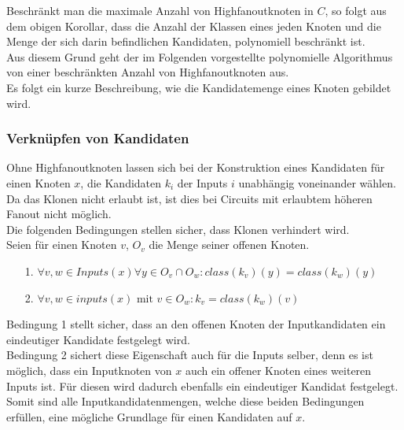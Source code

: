 \documentclass[11pt, a4paper, german]{article}
\begin{document}
Beschränkt man die maximale Anzahl von Highfanoutknoten in $C$, so folgt aus dem obigen Korollar, dass die Anzahl der Klassen eines jeden Knoten und die Menge der sich darin befindlichen Kandidaten, polynomiell beschränkt ist. \\
Aus diesem Grund geht der im Folgenden vorgestellte polynomielle Algorithmus von einer beschränkten Anzahl von Highfanoutknoten aus.\\ 

Es folgt ein kurze Beschreibung, wie die Kandidatemenge eines Knoten gebildet wird.

\subsubsection{Verknüpfen von Kandidaten}
Ohne Highfanoutknoten lassen sich bei der Konstruktion eines Kandidaten für einen Knoten $x$, die Kandidaten $k_i$ der Inputs $i$ unabhängig voneinander wählen.
Da das Klonen nicht erlaubt ist, ist dies bei Circuits mit erlaubtem höheren Fanout nicht möglich.\\
Die folgenden Bedingungen stellen sicher, dass Klonen verhindert wird. \\
Seien für einen Knoten $v$, $O_v$ die Menge seiner offenen Knoten.
\begin{itemize}
	\item[1.] $\forall v,w \in Inputs(x) \forall y \in O_v \cap O_w : class(k_v)(y) = class(k_w)(y)$
	\item[2.] $\forall v,w \in inputs(x) \text{ mit } v \in O_w : k_v = class(k_w)(v)$
\end{itemize}
Bedingung 1 stellt sicher, dass an den offenen Knoten der Inputkandidaten ein eindeutiger Kandidate festgelegt wird.\\ Bedingung 2 sichert diese Eigenschaft auch für die Inputs selber, denn es ist möglich, dass ein Inputknoten von $x$ auch ein offener Knoten eines weiteren Inputs ist. Für diesen wird dadurch ebenfalls ein eindeutiger Kandidat festgelegt. \\
Somit sind alle Inputkandidatenmengen, welche diese beiden Bedingungen erfüllen, eine mögliche Grundlage für einen Kandidaten auf $x$. 
\end{document}
